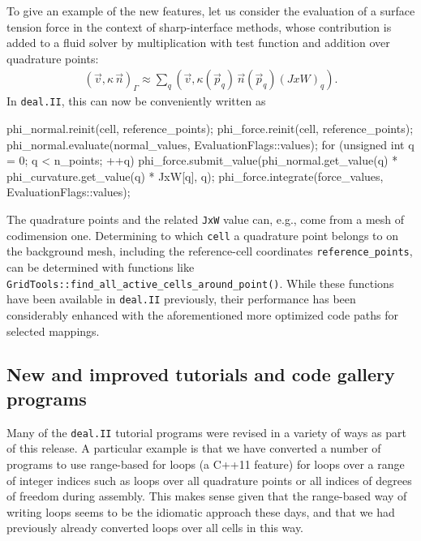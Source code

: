\documentclass{ansarticle-preprint}
\newcommand{\specialword}[1]{\texttt{#1}}
\newcommand{\dealii}{{\specialword{deal.II}}\xspace}
\begin{document}
To give an example of the new features, let us consider the evaluation of a
surface tension force in the context of sharp-interface methods, whose
contribution is added to a fluid solver by multiplication with test function
and addition over quadrature points:
\begin{align*}
\left(\vec{v}, \kappa \, \vec{n}\right)_\Gamma
\approx
\sum_q\left(\vec{v}, \kappa(\vec{p}_q) \, \vec{n}(\vec{p}_q) (JxW)_q\right).
\end{align*}
In \dealii{}, this can now be conveniently written as
\begin{c++}
phi_normal.reinit(cell, reference_points);
phi_force.reinit(cell, reference_points);
phi_normal.evaluate(normal_values, EvaluationFlags::values);
for (unsigned int q = 0; q < n_points; ++q)
   phi_force.submit_value(phi_normal.get_value(q) *
                          phi_curvature.get_value(q) * JxW[q], q);
phi_force.integrate(force_values, EvaluationFlags::values);
\end{c++}
The quadrature points and the related \texttt{JxW} value can, e.g., come from
a mesh of codimension one. Determining to which \texttt{cell} a quadrature
point belongs to on the background mesh, including the reference-cell
coordinates \texttt{reference\_points}, can be determined with functions like
\texttt{GridTools::find\_all\_active\_cells\_around\_point()}. While these
functions have been available in \dealii{} previously, their performance has
been considerably enhanced with the aforementioned more optimized code paths
for selected mappings.


\subsection{New and improved tutorials and code gallery programs}
\label{subsec:steps}

Many of the \dealii{} tutorial programs were revised in a variety of
ways as part of this release. A particular example is that we have
converted a number of programs to use range-based for loops (a C++11
feature) for loops over a range of integer indices such as loops over
all quadrature points or all indices of degrees of freedom during
assembly. This makes sense given that the
range-based way of writing loops seems to be the idiomatic approach
these days, and that we had previously already converted loops over
all cells in this way.
\end{document}
